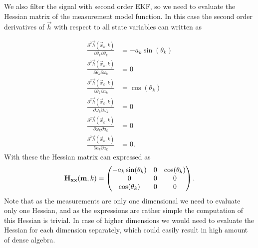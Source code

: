 We also filter the signal with second order EKF, so we need to
evaluate the Hessian matrix of the measurement model function.  In
this case the second order derivatives of $\vec{h}$ with respect to
all state variables can written as

\begin{equation}
\begin{split}
%
\frac{\partial^2 \vec{h}(\vec{x}_{k},k)}{\partial \theta_k \partial
\theta_k} &= -a_k\sin(\theta_k)\\ \frac{\partial^2
\vec{h}(\vec{x}_{k},k)}{\partial \theta_k \partial \omega_k} &= 0\\
\frac{\partial^2 \vec{h}(\vec{x}_{k},k)}{\partial \theta_k \partial
a_k} &= \cos(\theta_k)\\ \frac{\partial^2
\vec{h}(\vec{x}_{k},k)}{\partial \omega_k \partial \omega_k} &= 0\\
\frac{\partial^2 \vec{h}(\vec{x}_{k},k)}{\partial \omega_k \partial
a_k} &= 0\\ \frac{\partial^2 \vec{h}(\vec{x}_{k},k)}{\partial a_k
\partial a_k} &= 0.
%
\end{split}
\end{equation} With these the Hessian matrix can expressed as
%
\begin{equation}
%
\mat{H}_{\vec{xx}}(\vec{m},k) = \begin{pmatrix} -a_k\sin(\theta_k) & 0
& \cos(\theta_k) \\ 0 & 0 & 0 \\ \cos(\theta_k) & 0 & 0
\label{eq:ekf_demo1_hessian}
\end{pmatrix}.
%
\end{equation}
%
Note that as the measurements are only one dimensional we need to
evaluate only one Hessian, and as the expressions are rather simple
the computation of this Hessian is trivial. In case of higher
dimensions we would need to evaluate the Hessian for each dimension
separately, which could easily result in high amount of dense algebra.


